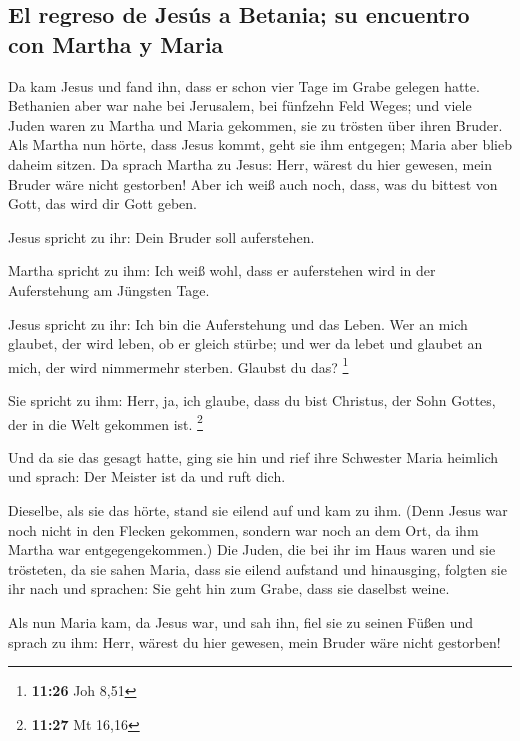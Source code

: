 \hypertarget{el-regreso-de-jesuxfas-a-betania-su-encuentro-con-martha-y-maria}{%
\subsection{El regreso de Jesús a Betania; su encuentro con Martha y
Maria}\label{el-regreso-de-jesuxfas-a-betania-su-encuentro-con-martha-y-maria}}

 Da kam Jesus und fand ihn, dass er schon vier Tage im
Grabe gelegen hatte.  Bethanien aber war nahe bei
Jerusalem, bei fünfzehn Feld Weges;  und viele Juden
waren zu Martha und Maria gekommen, sie zu trösten über ihren Bruder.
 Als Martha nun hörte, dass Jesus kommt, geht sie ihm
entgegen; Maria aber blieb daheim sitzen.  Da sprach
Martha zu Jesus: Herr, wärest du hier gewesen, mein Bruder wäre nicht
gestorben!  Aber ich weiß auch noch, dass, was du bittest
von Gott, das wird dir Gott geben.

 Jesus spricht zu ihr: Dein Bruder soll auferstehen.

 Martha spricht zu ihm: Ich weiß wohl, dass er
auferstehen wird in der Auferstehung am Jüngsten Tage.

 Jesus spricht zu ihr: Ich bin die Auferstehung und das
Leben. Wer an mich glaubet, der wird leben, ob er gleich stürbe;
 und wer da lebet und glaubet an mich, der wird
nimmermehr sterben. Glaubst du das? \footnote{\textbf{11:26} Joh 8,51}

 Sie spricht zu ihm: Herr, ja, ich glaube, dass du bist
Christus, der Sohn Gottes, der in die Welt gekommen ist. \footnote{\textbf{11:27}
  Mt 16,16}

 Und da sie das gesagt hatte, ging sie hin und rief ihre
Schwester Maria heimlich und sprach: Der Meister ist da und ruft dich.

 Dieselbe, als sie das hörte, stand sie eilend auf und
kam zu ihm.  (Denn Jesus war noch nicht in den Flecken
gekommen, sondern war noch an dem Ort, da ihm Martha war
entgegengekommen.)  Die Juden, die bei ihr im Haus waren
und sie trösteten, da sie sahen Maria, dass sie eilend aufstand und
hinausging, folgten sie ihr nach und sprachen: Sie geht hin zum Grabe,
dass sie daselbst weine.

 Als nun Maria kam, da Jesus war, und sah ihn, fiel sie
zu seinen Füßen und sprach zu ihm: Herr, wärest du hier gewesen, mein
Bruder wäre nicht gestorben!

